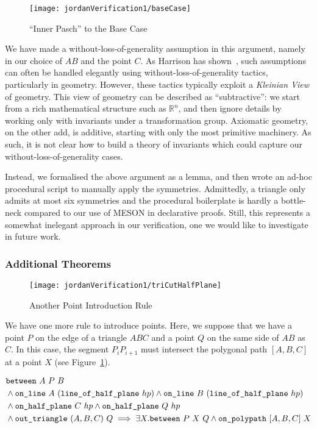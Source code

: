 \begin{figure}
\centering\texttt{[image: jordanVerification1/baseCase]}
\caption{``Inner Pasch'' to the Base Case}
\end{figure}

We have made a without-loss-of-generality assumption in this argument, namely in our choice of $AB$ and the point $C$. As Harrison has shown~\cite{HarrisonWLOG}, such assumptions can often be handled elegantly using without-loss-of-generality tactics, particularly in geometry. However, these tactics typically exploit a \emph{Kleinian View} of geometry. This view of geometry can be described as ``subtractive'': we start from a rich mathematical structure such as $\mathbb{R}^n$, and then ignore details by working only with invariants under a transformation group. Axiomatic geometry, on the other add, is additive, starting with only the most primitive machinery. As such, it is not clear how to build a theory of invariants which could capture our without-loss-of-generality cases.

Instead, we formalised the above argument as a lemma, and then wrote an ad-hoc procedural script to manually apply the symmetries. Admittedly, a triangle only admits at most six symmetries and the procedural boilerplate is hardly a bottle-neck compared to our use of MESON in declarative proofs. Still, this represents a somewhat inelegant approach in our verification, one we would like to investigate in future work.

\subsubsection{Additional Theorems}\label{sec:AdditionalTheorems}
\begin{figure}
\centering
\texttt{[image: jordanVerification1/triCutHalfPlane]}
\caption{Another Point Introduction Rule}
\label{fig:triCutHalfPlane}
\end{figure}

We have one more rule to introduce points. Here, we suppose that we have a point $P$ on the edge of a triangle $ABC$ and a point $Q$ on the same side of $AB$ as $C$. In this case, the segment $P_iP_{i+1}$ must intersect the polygonal path $[A,B,C]$ at a point $X$ (see Figure~\ref{fig:triCutHalfPlane}). 

\begin{equation}\label{eq:triCutHalfPlane}
\begin{split}
&\between{A}{P}{B}\\
&\wedge \code{on\_line}\ A\ (\code{line\_of\_half\_plane}\ hp) \wedge \code{on\_line}\ B\ (\code{line\_of\_half\_plane}\ hp)\\
&\wedge \code{on\_half\_plane}\ C\ hp \wedge \code{on\_half\_plane}\ Q\ hp\\
&\wedge \code{out\_triangle}\ (A,B,C)\ Q\implies \exists X. \between{P}{X}{Q} \wedge \code{on\_polypath}\ [A,B,C]\ X
\end{split}
\end{equation}

